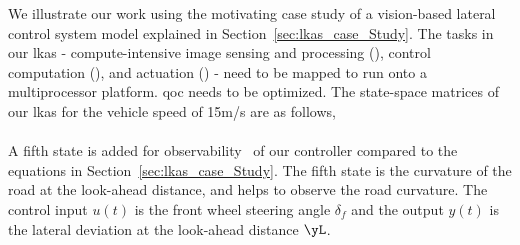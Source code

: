 We illustrate our work using the motivating case study of a vision-based lateral control system model explained in Section~\ref{sec:lkas_case_Study}.
The tasks in our \gls{lkas} - compute-intensive image sensing and processing (\taskS), control computation (\taskC), and actuation (\taskA) - need to be mapped to run onto a multiprocessor platform. \Gls{qoc} needs to be optimized.
The state-space matrices of our \gls{lkas} for the vehicle speed of 15m/s are as follows,
\\[1ex]
\\[1ex]
A fifth state is added for observability~\cite{kosecka1997vision} of our controller compared to the equations in Section~\ref{sec:lkas_case_Study}.
The fifth state is the curvature of the road at the look-ahead distance, and helps to observe the road curvature. The control input $u(t)$ is the front wheel steering angle $\delta_f$ and the output $y(t)$ is the lateral deviation at the look-ahead distance $\yL$.

